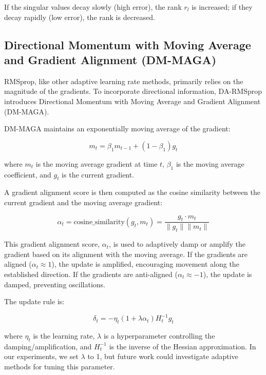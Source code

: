 \documentclass[a4paper,11pt]{article}
\begin{document}
If the singular values decay slowly (high error), the rank \(r_l\) is increased; if they decay rapidly (low error), the rank is decreased.

\subsection{Directional Momentum with Moving Average and Gradient Alignment (DM-MAGA)}

RMSprop, like other adaptive learning rate methods, primarily relies on the magnitude of the gradients. To incorporate directional information, DA-RMSprop introduces Directional Momentum with Moving Average and Gradient Alignment (DM-MAGA).

DM-MAGA maintains an exponentially moving average of the gradient:

\begin{equation}
    m_t = \beta_1 m_{t-1} + (1 - \beta_1) g_t
    \label{eq:moving_average}
\end{equation}

where \(m_t\) is the moving average gradient at time \(t\), \(\beta_1\) is the moving average coefficient, and \(g_t\) is the current gradient.

A gradient alignment score is then computed as the cosine similarity between the current gradient and the moving average gradient:

\begin{equation}
    \alpha_t = \text{cosine\_similarity}(g_t, m_t) = \frac{g_t \cdot m_t}{\|g_t\| \|m_t\|}
    \label{eq:cosine_similarity}
\end{equation}

This gradient alignment score, \(\alpha_t\), is used to adaptively damp or amplify the gradient based on its alignment with the moving average. If the gradients are aligned (\(\alpha_t \approx 1\)), the update is amplified, encouraging movement along the established direction. If the gradients are anti-aligned (\(\alpha_t \approx -1\)), the update is damped, preventing oscillations.

The update rule is:

\begin{equation}
    \delta_t = -\eta_t (1 + \lambda \alpha_t) H_t^{-1} g_t
    \label{eq:delta_t}
\end{equation}

where \(\eta_t\) is the learning rate, \(\lambda\) is a hyperparameter controlling the damping/amplification, and \(H_t^{-1}\) is the inverse of the Hessian approximation. In our experiments, we set \(\lambda\) to 1, but future work could investigate adaptive methods for tuning this parameter.
\end{document}
